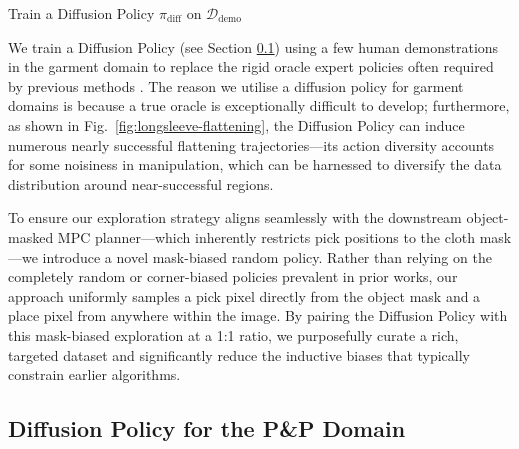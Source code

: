 \documentclass[journal]{IEEEtran}
\begin{document}
\begin{algorithm}[t]
\caption{Data Collection with Diffusion and Random Policies for Offline Reinforcement Learning}
\label{alg:data-collection}
\LinesNumbered 
{}

\BlankLine

Train a Diffusion Policy $\pi_{\text{diff}}$ on $\mathcal{D}_{\text{demo}}$ \;

\BlankLine
{}
\BlankLine
{}
\end{algorithm}

We train a Diffusion Policy \cite{chi2023diffusionpolicy} (see Section \ref{sec:diffusion}) using a few human demonstrations in the garment domain to replace the rigid oracle expert policies often required by previous methods \cite{kadi2024planet}. The reason we utilise a diffusion policy for garment domains is because a true oracle is exceptionally difficult to develop; furthermore, as shown in Fig.~\ref{fig:longsleeve-flattening}, the Diffusion Policy can induce numerous nearly successful flattening trajectories---its action diversity accounts for some noisiness in manipulation, which can be harnessed to diversify the data distribution around near-successful regions. 

To ensure our exploration strategy aligns seamlessly with the downstream object-masked MPC planner---which inherently restricts pick positions to the cloth mask---we introduce a novel mask-biased random policy. Rather than relying on the completely random or corner-biased policies prevalent in prior works, our approach uniformly samples a pick pixel directly from the object mask and a place pixel from anywhere within the image. By pairing the Diffusion Policy with this mask-biased exploration at a 1:1 ratio, we purposefully curate a rich, targeted dataset and significantly reduce the inductive biases that typically constrain earlier algorithms.
\subsection{Diffusion Policy for the P\&P Domain} \label{sec:diffusion}
\end{document}
